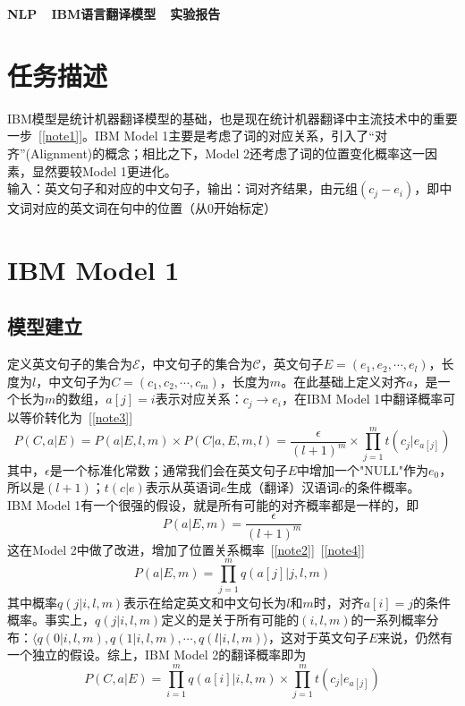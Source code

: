 \documentclass[11pt]{article}
\begin{document}
\begin{flushleft}
{\Huge{\textbf{NLP\ \ IBM语言翻译模型\ \ 实验报告}}}\\
\end{flushleft}
\section{任务描述}
\hspace{1.6em} IBM模型是统计机器翻译模型的基础，也是现在统计机器翻译中主流技术中的重要一步~[\ref{note1}]。IBM Model 1主要是考虑了词的对应关系，引入了“对齐”(Alignment)的概念；相比之下，Model 2还考虑了词的位置变化概率这一因素，显然要较Model 1更进化。\\
\indent 输入：英文句子和对应的中文句子，输出：词对齐结果，由元组$(c_j-e_i)$，即中文词对应的英文词在句中的位置（从0开始标定）

\section{IBM Model 1}
\subsection{模型建立}
\hspace{1.6em} 定义英文句子的集合为$\mathcal{E}$，中文句子的集合为$\mathcal{C}$，英文句子$E=(e_1, e_2, \cdots, e_l)$，长度为$l$，中文句子为$C=(c_1, c_2, \cdots, c_m)$，长度为$m$。在此基础上定义对齐$a$，是一个长为$m$的数组，$a[j]=i$表示对应关系：$c_j\rightarrow e_i$，在IBM Model 1中翻译概率可以等价转化为~[\ref{note3}]
\begin{equation}\label{transp1}
P(C,a|E)=P(a|E,l,m)\times P(C|a,E,m,l)=\frac{\epsilon}{(l+1)^m}\times \prod_{j=1}^{m}t(c_j|e_{a[j]})
\end{equation}
\hspace{1.6em} 其中，$\epsilon$是一个标准化常数；通常我们会在英文句子$E$中增加一个"NULL"作为$e_0$，所以是$(l+1)$；$t(c|e)$表示从英语词$e$生成（翻译）汉语词$c$的条件概率。\\
\indent IBM Model 1有一个很强的假设，就是所有可能的对齐概率都是一样的，即
\begin{equation}\label{model1}
P(a|E,m)=\frac{\epsilon}{(l+1)^m}
\end{equation}
\hspace{1.6em} 这在Model 2中做了改进，增加了位置关系概率~[\ref{note2}]~[\ref{note4}]
\begin{equation}\label{model2q}
P(a|E,m) = \prod_{j=1}^{m}q(a[j]|j, l, m)
\end{equation}
\hspace{1.6em} 其中概率$q(j|i, l, m)$表示在给定英文和中文句长为$l$和$m$时，对齐$a[i]=j$的条件概率。事实上，$q(j|i, l, m)$定义的是关于所有可能的$(i,l,m)$的一系列概率分布：$\langle q(0|i, l, m), q(1|i, l, m), \cdots , q(l|i, l, m)\rangle$，这对于英文句子$E$来说，仍然有一个独立的假设。综上，IBM Model 2的翻译概率即为
\begin{equation}\label{transp2}
P(C,a|E)=\prod_{i=1}^{m}q(a[i]|i, l, m)\times \prod_{j=1}^{m}t(c_j|e_{a[j]})
\end{equation}
\end{document}
